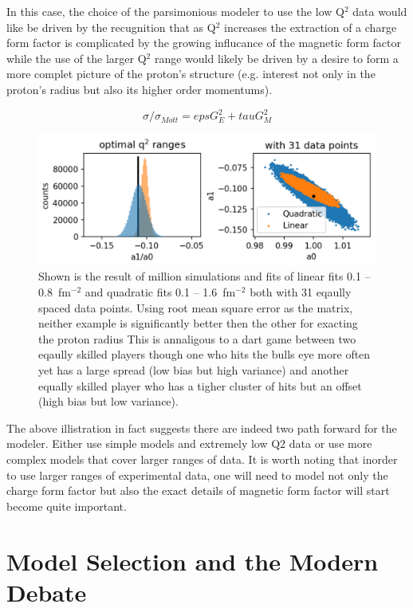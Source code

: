 \documentclass[10pt,aps,prc,twocolumn]{revtex4-1}
\begin{document}
In this case, the choice of the parsimonious modeler to use the low Q$^2$ data would like be driven by the recugnition that as Q$^2$ increases
the extraction of a charge form factor is complicated by the growing influcance of the magnetic form factor while the use of the larger Q$^2$
range would likely be driven by a desire to form a more complet picture of the proton's structure (e.g. interest not only in the proton's radius
but also its higher order momentums).

\begin{equation}
\sigma / \sigma_{Mott} = eps G_E^2 + tau G_M^2
\end{equation}

\begin{figure}
\label{zoptimized}
\includegraphics[width=\columnwidth]{Figure/zoptimized.png}
\caption{Shown is the result of million simulations and fits of linear fits  0.1 -- 0.8~fm$^{-2}$ 
and quadratic fits 0.1 -- 1.6~fm$^{-2}$ both with 31 eqaully spaced data points.    Using root mean
square error as the matrix, neither example is significantly better then the other for exacting the proton
radius   This is annaligous to a dart game between two eqaully skilled players though one who hits the bulls eye more 
often yet has a large spread (low bias but high variance) and another equally skilled player who has a tigher cluster of hits
but an offset (high bias but low variance).}
\end{figure}

The above illistration in fact suggests there are indeed two path forward for the modeler.   Either use simple models and extremely low Q2 
data or use more complex models that cover larger ranges of data.   It is worth noting that inorder to use larger ranges
of experimental data, one will need to model not only the charge form factor but also the exact details of  magnetic form factor
will start become quite important.


\section{Model Selection and the Modern Debate}
\end{document}
